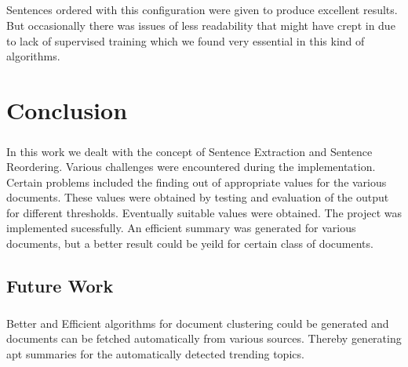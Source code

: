 \paragraph{} Sentences ordered with this configuration were given to produce excellent results. But occasionally there was issues of less readability that might have crept in due to lack of supervised training which we found very essential in this kind of algorithms.

\chapter{Conclusion}
\paragraph{} In this work we dealt with the concept of Sentence Extraction and Sentence Reordering. Various challenges were encountered during the implementation. Certain problems included the finding out of appropriate values for the various documents. These values were obtained by testing and evaluation of the output for different thresholds. Eventually suitable values were obtained. The project was implemented sucessfully. An efficient summary was generated for various documents, but a better result could be yeild for certain class of documents. 
\section{Future Work}
\paragraph{} Better and Efficient algorithms for document clustering could be generated and documents can be fetched automatically from various sources. Thereby generating apt summaries for the automatically detected trending topics. 